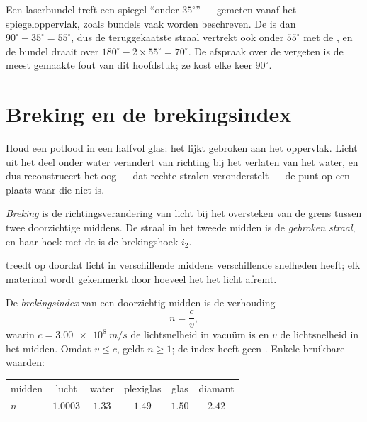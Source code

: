 \begin{example}\label{ex:g10:refraction:mirror}
Een laserbundel treft een spiegel ``onder $35^\circ$'' --- gemeten vanaf
het spiegeloppervlak, zoals bundels vaak worden beschreven. De 
is dan $90^\circ - 35^\circ = 55^\circ$, dus de teruggekaatste straal
vertrekt ook onder $55^\circ$ met de , en de bundel draait over
$180^\circ - 2 \times 55^\circ = 70^\circ$. De afspraak over de 
vergeten is de meest gemaakte fout van dit hoofdstuk; ze kost elke keer
$90^\circ$.
\end{example}

\section{Breking en de brekingsindex}

Houd een potlood in een halfvol glas: het lijkt gebroken aan het
oppervlak. Licht uit het deel onder water verandert van richting bij het
verlaten van het water, en dus reconstrueert het oog --- dat rechte
stralen veronderstelt --- de punt op een plaats waar die niet is.

\begin{definition}[Breking]\label{def:g10:refraction:refraction}
\emph{Breking} is de richtingsverandering van licht bij het
oversteken van de grens tussen twee doorzichtige middens. De straal in
het tweede midden is de \emph{gebroken straal}, en
haar hoek met de  is de brekingshoek $i_2$.
\end{definition}

 treedt op doordat licht in verschillende middens verschillende
snelheden heeft; elk materiaal wordt gekenmerkt door hoeveel het het
licht afremt.

\begin{definition}[Brekingsindex]\label{def:g10:refraction:index}
De \emph{brekingsindex} van een doorzichtig midden
is de verhouding
\[
n = \frac{c}{v},
\]
waarin $c = \qty{3.00e8}{m/s}$ de lichtsnelheid in vacuüm is en $v$ de
lichtsnelheid in het midden. Omdat $v \leq c$, geldt $n \geq 1$; de index
heeft geen . Enkele bruikbare waarden:
\begin{center}
\begin{tabular}{lccccc}
midden & lucht & water & plexiglas & glas & diamant \\
$n$ & $1.0003$ & $1.33$ & $1.49$ & $1.50$ & $2.42$ \\
\end{tabular}
\end{center}
\end{definition}

